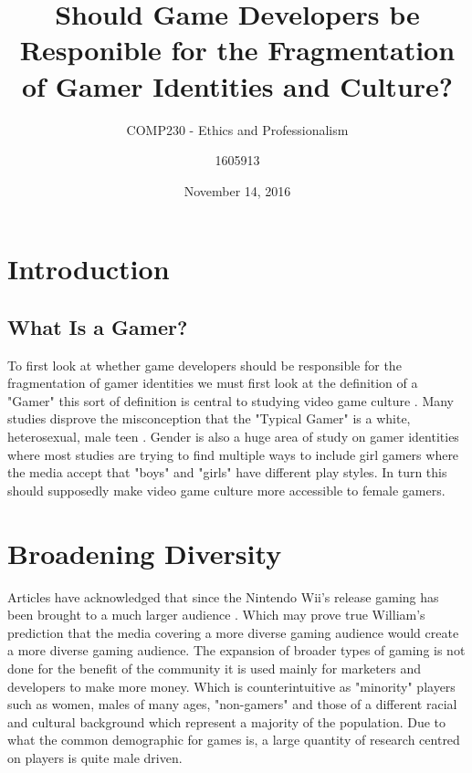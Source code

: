 \documentclass[11pt]{scrartcl}
\title{Should Game Developers be Responible for the Fragmentation of Gamer Identities and Culture?}
\date{November 14, 2016}
\subtitle{COMP230 - Ethics and Professionalism}
\author{1605913}
\begin{document}
\maketitle


\section{Introduction}

\subsection{What Is a Gamer?}
To first look at whether game developers should be responsible for the fragmentation of gamer identities we must first look at the definition of a "Gamer" this sort of definition is central to studying video game culture \cite{shaw2010video}. Many studies disprove the misconception that the "Typical Gamer" is a white, heterosexual, male teen \cite{JCC4:JCC4428}. Gender is also a huge area of study on gamer identities where most studies are trying to find multiple ways to include girl gamers where the media accept that "boys" and "girls" have different play styles. In turn this should supposedly make video game culture more accessible to female gamers.\cite{cassell2000barbie}

\section{Broadening Diversity}
Articles have acknowledged that since the Nintendo Wii's release gaming has been brought to a much larger audience \cite{schiesel_2007}. Which may prove true William's prediction that the media covering a more diverse gaming audience would create a more diverse gaming audience. \cite{williams2003video} The expansion of broader types of gaming is not done for the benefit of the community it is used mainly for marketers and developers to make more money.\cite{elliott_2005} Which is counterintuitive as "minority" players such as women, males of many ages, "non-gamers" and those of a different racial and cultural background which represent a majority of the population.\cite{fron2007hegemony} Due to what the common demographic for games is, a large quantity of research centred on players is quite male driven.\cite{fron2007hegemony}
\end{document}
